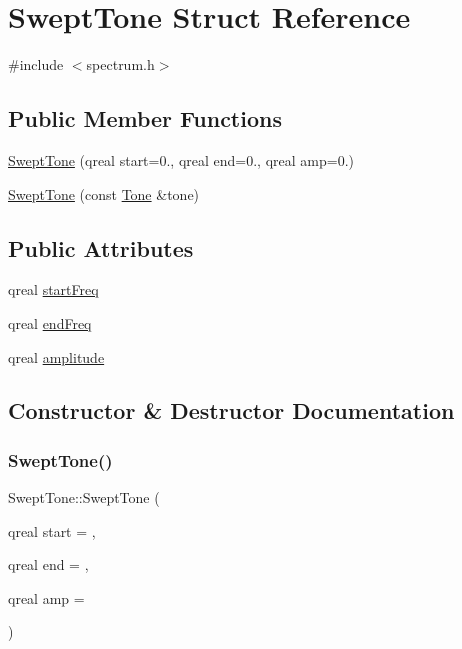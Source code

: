 \hypertarget{struct_swept_tone}{}\section{Swept\+Tone Struct Reference}
\label{struct_swept_tone}


{\ttfamily \#include $<$spectrum.\+h$>$}

\subsection*{Public Member Functions}
\begin{DoxyCompactItemize}
\item 
\hyperlink{struct_swept_tone_a905368d1daa77ab33e190b5d47c26218}{Swept\+Tone} (qreal start=0., qreal end=0., qreal amp=0.)
\item 
\hyperlink{struct_swept_tone_a79a1bcd511e7fc9b847603c4cefaa03c}{Swept\+Tone} (const \hyperlink{struct_tone}{Tone} \&tone)
\end{DoxyCompactItemize}
\subsection*{Public Attributes}
\begin{DoxyCompactItemize}
\item 
qreal \hyperlink{struct_swept_tone_acfccd7b4e61255b6061bb8151067db79}{start\+Freq}
\item 
qreal \hyperlink{struct_swept_tone_abad3f34970552d406721eb8c051911e5}{end\+Freq}
\item 
qreal \hyperlink{struct_swept_tone_a335b714b2688aa70154b736662b95d09}{amplitude}
\end{DoxyCompactItemize}


\subsection{Constructor \& Destructor Documentation}
\hypertarget{struct_swept_tone_a905368d1daa77ab33e190b5d47c26218}{}\label{struct_swept_tone_a905368d1daa77ab33e190b5d47c26218} 
\subsubsection{\texorpdfstring{Swept\+Tone()}{SweptTone()}\hspace{0.1cm}{\footnotesize\ttfamily [1/2]}}
{\footnotesize\ttfamily Swept\+Tone\+::\+Swept\+Tone (\begin{DoxyParamCaption}\item[{qreal}]{start = {},  }\item[{qreal}]{end = {},  }\item[{qreal}]{amp = {} }\end{DoxyParamCaption})\hspace{0.3cm}{\ttfamily [inline]}}


